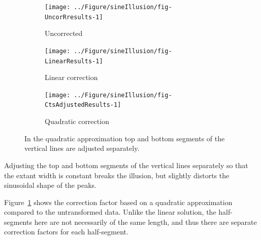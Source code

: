 \documentclass[11pt]{isuthesis}\usepackage[]{graphicx}\usepackage[]{color}
\newenvironment{knitrout}{}{} %
\begin{document}
\begin{figure}
\begin{subfigure}[b]{.32\textwidth}\centering
\begin{knitrout}
\color{fgcolor}

{\centering \texttt{[image: ../Figure/sineIllusion/fig-UncorRresults-1]} 

}



\end{knitrout}
\caption{Uncorrected}
\end{subfigure}
\begin{subfigure}[b]{.32\textwidth}\centering
\begin{knitrout}
\color{fgcolor}

{\centering \texttt{[image: ../Figure/sineIllusion/fig-LinearResults-1]} 

}



\end{knitrout}
\caption{Linear correction}
\end{subfigure}
\begin{subfigure}[b]{.32\textwidth}\centering
\begin{knitrout}
\color{fgcolor}

{\centering \texttt{[image: ../Figure/sineIllusion/fig-CtsAdjustedResults-1]} 

}



\end{knitrout}
\caption{Quadratic correction}
\end{subfigure}
\caption[Quadratic Approximation]{
In the quadratic approximation top and bottom segments of the vertical lines are adjusted separately.}
\label{fig:GeneralQuadraticCorrection} 
\end{figure}

Adjusting the top and bottom segments of the vertical lines separately so that the extant width is constant breaks the illusion, but slightly distorts the sinusoidal shape of the peaks.

Figure~\ref{fig:GeneralQuadraticCorrection} shows the correction factor based on a quadratic approximation compared to the untransformed data. 
Unlike the linear solution, the half-segments here are not necessarily of the same length, and thus there are separate correction factors for each half-segment. 
\end{document}
